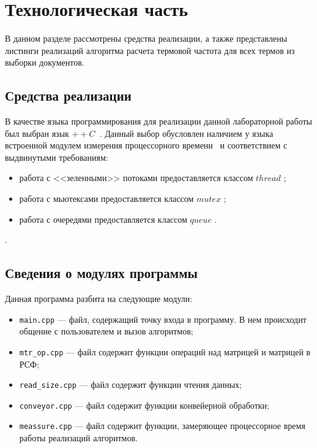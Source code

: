 \chapter{Технологическая часть}

В данном разделе рассмотрены средства реализации, а также представлены листинги реализаций алгоритма расчета термовой частота для всех термов из выборки документов.

\section{Средства реализации}

В качестве языка программирования для реализации данной лабораторной работы был выбран язык $++C$~\cite{cpp-lang}. Данный выбор обусловлен наличием у языка встроенной модулем измерения процессорного времени~\cite{cpp-time} и соответствием с выдвинутыми требованиям:
\begin{itemize}
	\item работа с <<зеленными>> потоками предоставляется классом $thread$ \cite{thread};
	\item работа с мьютексами предоставляется классом $mutex$ \cite{mutex};
	\item работа с очередями предоставляется классом $queue$ \cite{queue}.
\end{itemize}.

\section{Сведения о модулях программы}

Данная программа разбита на следующие модули:

\begin{itemize}[label=---]
	\item \texttt{main.cpp} --- файл, содержащий точку входа в программу. В нем происходит общение с пользователем и вызов алгоритмов;
	\item \texttt{mtr\_op.cpp} --- файл содержит функции операций над матрицей и матрицей в РСФ;
	\item \texttt{read\_size.cpp} --- файл содержит функции чтения данных;
	\item \texttt{conveyor.cpp} --- файл содержит функции конвейерной обработки;
	\item \texttt{meassure.cpp} --- файл содержит функции, замеряющее процессорное время работы реализаций алгоритмов.
\end{itemize}

